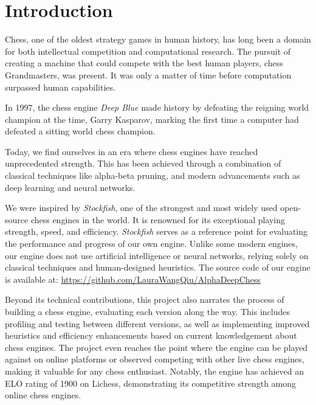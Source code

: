 \chapter{Introduction}
\label{cap:introduction}
\renewcommand{\figurename}{Figure}

Chess, one of the oldest strategy games in human history, has long been a domain for both intellectual competition and computational research. The pursuit of creating a machine that could compete with the best human players, chess Grandmasters, was present. It was only a matter of time before computation surpassed human capabilities.

\vspace{1em}

\noindent In 1997, the chess engine \textit{Deep Blue} made history by defeating the reigning world champion at the time, Garry Kasparov, marking the first time a computer had defeated a sitting world chess champion.
\vspace{1em}

\noindent Today, we find ourselves in an era where chess engines have reached unprecedented strength. This has been achieved through a combination of classical techniques like alpha-beta pruning, and modern advancements such as deep learning and neural networks.

\vspace{1em}

\noindent We were inspired by \textit{Stockfish}, one of the strongest and most widely used open-source chess engines in the world. It is renowned for its exceptional playing strength, speed, and efficiency. \textit{Stockfish} serves as a reference point for evaluating the performance and progress of our own engine. Unlike some modern engines, our engine does not use artificial intelligence or neural networks, relying solely on classical techniques and human-designed heuristics. The source code of our engine is available at: \url{https://github.com/LauraWangQiu/AlphaDeepChess}

\vspace{1em}

\noindent Beyond its technical contributions, this project also narrates the process of building a chess engine, evaluating each version along the way. This includes profiling and testing between different versions, as well as implementing improved heuristics and efficiency enhancements based on current knowledgement about chess engines. The project even reaches the point where the engine can be played against on online platforms or observed competing with other live chess engines, making it valuable for any chess enthusiast. Notably, the engine has achieved an ELO rating of 1900 on Lichess, demonstrating its competitive strength among online chess engines.

